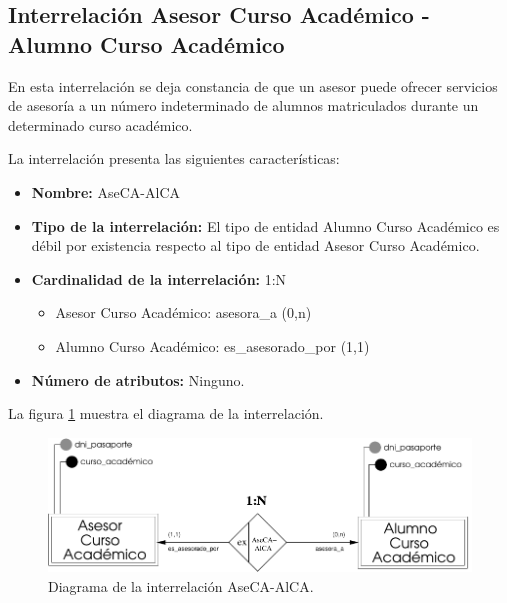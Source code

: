 \subsection{Interrelación Asesor Curso Académico - Alumno Curso Académico}

   \begin{description}
      \item[Definición] En esta interrelación se deja constancia de que un
      asesor puede ofrecer servicios de asesoría a un número indeterminado de
      alumnos matriculados durante un determinado curso académico.

      \item[Características] La interrelación presenta las siguientes
                             características:

         \begin{itemize}
            \item \textbf{Nombre:} AseCA-AlCA
            \item \textbf{Tipo de la interrelación:} El tipo de entidad
                  Alumno Curso Académico es débil por existencia respecto al
                  tipo de entidad Asesor Curso Académico.
            \item \textbf{Cardinalidad de la interrelación:} 1:N
                  \begin{itemize}
                     \item Asesor Curso Académico: asesora\_a (0,n)
                     \item Alumno Curso Académico: es\_asesorado\_por (1,1)
                  \end{itemize}
            \item \textbf{Número de atributos:} Ninguno.
         \end{itemize}

      \item[Diagrama] La figura \ref{diagramaAseCA-AlCA} muestra el diagrama de
                      la interrelación.

       \item \begin{figure}[!ht]
            \begin{center}
            \includegraphics[]{07.Modelo_Entidad-Interrelacion/7.3.Analisis_Interrelaciones/diagramas/AseCA-AlCA.pdf}
            \caption{Diagrama de la interrelación AseCA-AlCA.}
            \label{diagramaAseCA-AlCA}
            \end{center}
         \end{figure}


\end{description}
